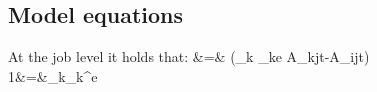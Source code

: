 \documentclass[a4paper, 12pt]{article}
\begin{document}
\subsection{Model equations}
At the job level it holds that:
\beqns
\Delta {}&=& \left(\sum_k \theta_{ke} \Delta \ln A_{kjt}-\Delta \ln A_{ijt}\right) \\
1&=&\sum_k\theta_k^e  \label{eq:total_sum} 
\eeqns
\end{document}

